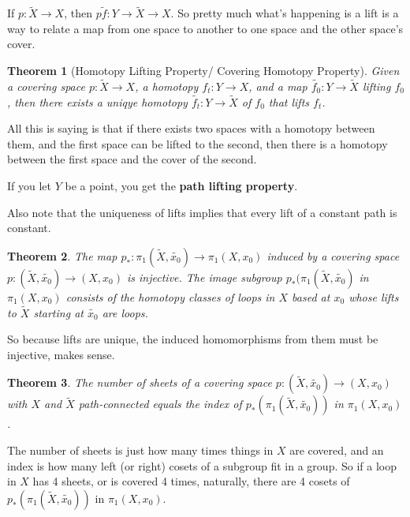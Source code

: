 \documentclass[12pt]{article}
\newtheorem{theorem}{Theorem}
\begin{document}
If $p: \tilde{X} \to X$, then $p \tilde{f} : Y \to \tilde{X} \to X$. So pretty much what's happening is a lift is a way to relate a map 
from one space to another to one space and the other space's cover. 

\begin{theorem}[Homotopy Lifting Property/ Covering Homotopy Property]
  Given a covering space $p: \tilde{X} \to X$, a homotopy $f_t:Y \to X$, and a map $\tilde{f_0}:Y \to \tilde{X}$ lifting $f_0$, then 
  there exists a uniqye homotopy $\tilde{f_t}: Y \to \tilde{X}$ of $f_0$ that lifts $f_t$. 
\end{theorem}

All this is saying is that if there exists two spaces with a homotopy between them, and the first space can be lifted to the second, then there is a homotopy between the first 
space and the cover of the second. 

\par If you let $Y$ be a point, you get the  \textbf{path lifting property}.

\par Also note that the uniqueness of lifts implies that every lift of a constant path is constant.

\begin{theorem}
  The map $p_*:\pi_1(\tilde{X},\tilde{x_0}) \to \pi_1(X, x_0)$ induced by a covering space $p:(\tilde{X},\tilde{x_0}) \to (X,x_0)$ is injective. 
  The image subgroup $p_*(\pi_1(\tilde{X}, \tilde{x_0})$ in $\pi_1(X,x_0)$ consists of the homotopy classes of loops in $X$ based at $x_0$ whose lifts 
  to $\tilde{X}$ starting at $\tilde{x_0}$ are loops.
\end{theorem}

So because lifts are unique, the induced homomorphisms from them must be injective, makes sense.

\begin{theorem}
  The number of sheets of a covering space $p:(\tilde{X}, \tilde{x_0}) \to (X,x_0)$ with $X$ and $\tilde{X}$ path-connected equals the index of $p_*(\pi_1(\tilde{X},\tilde{x_0}))$ in $\pi_1(X,x_0)$. 
\end{theorem}

The number of sheets is just how many times things in $X$ are covered, and an index is how many left (or right) cosets of a subgroup fit in a group. So if a loop in $X$ has 4 sheets, or is 
covered 4 times, naturally, there are 4 cosets of $p_*(\pi_1(\tilde{X},\tilde{x_0}))$ in $\pi_1(X,x_0)$.
\end{document}
